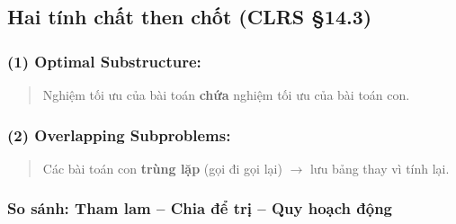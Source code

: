 \documentclass[10pt]{article}
\begin{document}
\subsection{\texorpdfstring{Hai tính chất then chốt (CLRS
\S 14.3)}{Hai tính chất then chốt (CLRS 14.3)}}\label{hai-tuxednh-chux1ea5t-then-chux1ed1t-clrs-14.3}

\subsubsection{(1) Optimal Substructure:}\label{optimal-substructure}

\begin{quote}
Nghiệm tối ưu của bài toán \textbf{chứa} nghiệm tối ưu của bài toán con.
\end{quote}

\subsubsection{(2) Overlapping
Subproblems:}\label{overlapping-subproblems}

\begin{quote}
Các bài toán con \textbf{trùng lặp} (gọi đi gọi lại) \(\to\) lưu bảng
thay vì tính lại.
\end{quote}

\subsubsection{So sánh: Tham lam -- Chia để trị -- Quy hoạch động}\label{greedy-dc-dp}
\end{document}
